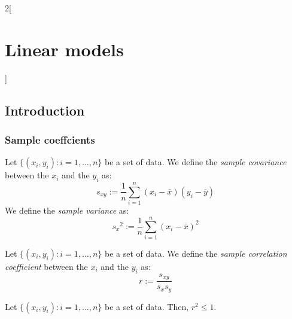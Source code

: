 \documentclass[../../../main_math.tex]{subfiles}
\begin{document}
\begin{multicols}{2}[\section{Linear models}]
  \subsection{Introduction}
  \subsubsection{Sample coeffcients}
  \begin{definition}
    Let $\{(x_i,y_i):i=1,\ldots,n\}$ be a set of data. We define the \emph{sample covariance} between the $x_i$ and the $y_i$ as: $$s_{xy}:=\frac{1}{n}\sum_{i=1}^n(x_i-\overline{x})(y_i-\overline{y})$$
    We define the \emph{sample variance} as: $${s_{x}}^2:=\frac{1}{n}\sum_{i=1}^n{(x_i-\overline{x})}^2$$
  \end{definition}
  \begin{definition}
    Let $\{(x_i,y_i):i=1,\ldots,n\}$ be a set of data. We define the \emph{sample correlation coefficient} between the $x_i$ and the $y_i$ as: $$r:=\frac{s_{xy}}{s_xs_y}$$
  \end{definition}
  \begin{proposition}
    Let $\{(x_i,y_i):i=1,\ldots,n\}$ be a set of data. Then, $r^2\leq 1$.
  \end{proposition}

\end{multicols}
\end{document}
